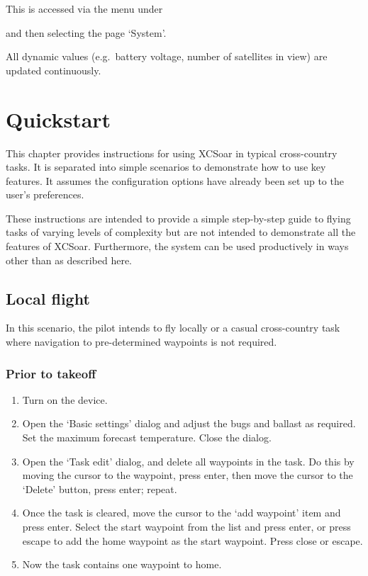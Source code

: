 \documentclass[a4paper,12pt]{refrep}
\begin{document}
This is accessed via the menu under 
\begin{quote}
\blink{}
\end{quote}
and then selecting the page `System'.

All dynamic values (e.g.\ battery voltage, number of satellites in
view) are updated continuously.

\chapter{Quickstart}\label{cha:quickstart}

This chapter provides instructions for using XCSoar in typical
cross-country tasks.  It is separated into simple scenarios to
demonstrate how to use key features.  It assumes the configuration
options have already been set up to the user's preferences.

These instructions are intended to provide a simple step-by-step guide
to flying tasks of varying levels of complexity but are not intended
to demonstrate all the features of XCSoar.  Furthermore, the system
can be used productively in ways other than as described here.

\section{Local flight}\label{sec:local-flight}

In this scenario, the pilot intends to fly locally or a casual
cross-country task where navigation to pre-determined waypoints is not
required.

\subsection*{Prior to takeoff}
\begin{enumerate}
\item Turn on the device.
\item Open the `Basic settings' dialog and adjust the bugs and ballast as required.  Set the maximum forecast temperature.  Close the dialog.
\item Open the `Task edit' dialog, and delete all waypoints in the task.  Do this by moving the cursor to the waypoint, press enter, then move the cursor to the `Delete' button, press enter; repeat.
\item Once the task is cleared, move the cursor to the `add waypoint' item and press enter.  Select the start waypoint from the list and press enter, or press escape to add the home waypoint as the start waypoint.  Press close or escape.
\item Now the task contains one waypoint to home.
\end{enumerate}
\end{document}
